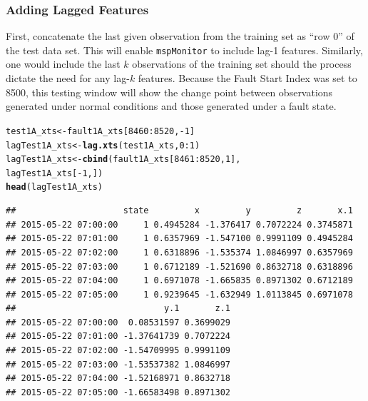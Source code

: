 \documentclass{report}\usepackage[]{graphicx}\usepackage[]{color}
\makeatletter
\newcommand{\hlnum}[1]{\textcolor[rgb]{0.686,0.059,0.569}{#1}}%
\newcommand{\hlopt}[1]{\textcolor[rgb]{0,0,0}{#1}}%
\newcommand{\hlstd}[1]{\textcolor[rgb]{0.345,0.345,0.345}{#1}}%
\newcommand{\hlkwb}[1]{\textcolor[rgb]{0.69,0.353,0.396}{#1}}%
\newcommand{\hlkwd}[1]{\textcolor[rgb]{0.737,0.353,0.396}{\textbf{#1}}}%
\newenvironment{kframe}{%
 \def\at@end@of@kframe{}%
 \ifinner\ifhmode%
  \def\at@end@of@kframe{\end{minipage}}%
  \begin{minipage}{\columnwidth}%
 \fi\fi%
 \def\FrameCommand##1{\hskip\@totalleftmargin \hskip-\fboxsep
 \colorbox{shadecolor}{##1}\hskip-\fboxsep
     \hskip-\linewidth \hskip-\@totalleftmargin \hskip\columnwidth}%
 \MakeFramed {\advance\hsize-\width
   \@totalleftmargin\z@ \linewidth\hsize
   \@setminipage}}%
 {\par\unskip\endMakeFramed%
 \at@end@of@kframe}
\newenvironment{knitrout}{}{} %
\makeatother
\begin{document}
\subsubsection{Adding Lagged Features}
First, concatenate the last given observation from the training set as ``row 0'' of the test data set. This will enable \texttt{mspMonitor} to include lag-1 features. Similarly, one would include the last $k$ observations of the training set should the process dictate the need for any lag-$k$ features. Because the Fault Start Index was set to 8500, this testing window will show the change point between observations generated under normal conditions and those generated under a fault state.
\begin{knitrout}
\color{fgcolor}\begin{kframe}
\begin{alltt}
\hlstd{test1A_xts} \hlkwb{<-} \hlstd{fault1A_xts[}\hlnum{8460}\hlopt{:}\hlnum{8520}\hlstd{,} \hlopt{-}\hlnum{1}\hlstd{]}
\hlstd{lagTest1A_xts} \hlkwb{<-} \hlkwd{lag.xts}\hlstd{(test1A_xts,} \hlnum{0}\hlopt{:}\hlnum{1}\hlstd{)}
\hlstd{lagTest1A_xts} \hlkwb{<-} \hlkwd{cbind}\hlstd{(fault1A_xts[}\hlnum{8461}\hlopt{:}\hlnum{8520}\hlstd{,}\hlnum{1}\hlstd{],}
                       \hlstd{lagTest1A_xts[}\hlopt{-}\hlnum{1}\hlstd{,])}
\hlkwd{head}\hlstd{(lagTest1A_xts)}
\end{alltt}
\begin{verbatim}
##                     state         x         y         z       x.1
## 2015-05-22 07:00:00     1 0.4945284 -1.376417 0.7072224 0.3745871
## 2015-05-22 07:01:00     1 0.6357969 -1.547100 0.9991109 0.4945284
## 2015-05-22 07:02:00     1 0.6318896 -1.535374 1.0846997 0.6357969
## 2015-05-22 07:03:00     1 0.6712189 -1.521690 0.8632718 0.6318896
## 2015-05-22 07:04:00     1 0.6971078 -1.665835 0.8971302 0.6712189
## 2015-05-22 07:05:00     1 0.9239645 -1.632949 1.0113845 0.6971078
##                             y.1       z.1
## 2015-05-22 07:00:00  0.08531597 0.3699029
## 2015-05-22 07:01:00 -1.37641739 0.7072224
## 2015-05-22 07:02:00 -1.54709995 0.9991109
## 2015-05-22 07:03:00 -1.53537382 1.0846997
## 2015-05-22 07:04:00 -1.52168971 0.8632718
## 2015-05-22 07:05:00 -1.66583498 0.8971302
\end{verbatim}
\end{kframe}
\end{knitrout}
\end{document}
